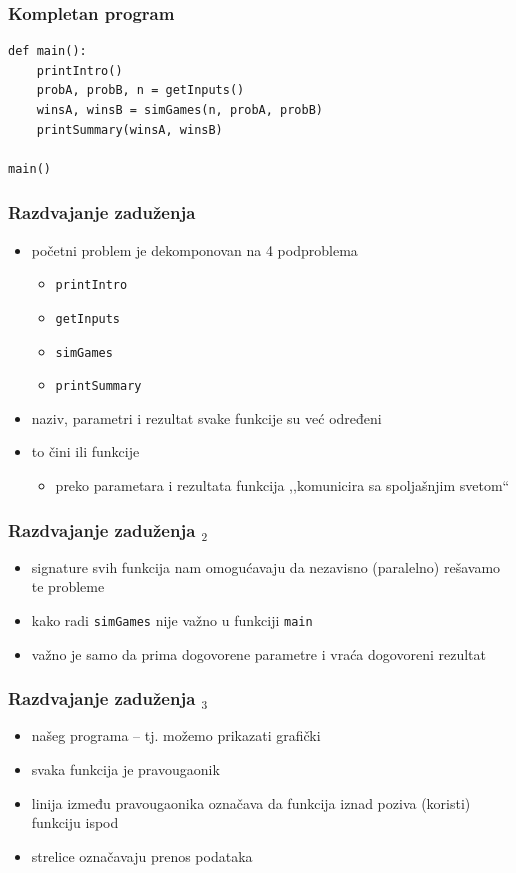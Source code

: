 \documentclass[utf8,compress]{beamer}
\begin{document}
\begin{frame}[fragile]
  \frametitle{Kompletan program}
\begin{verbatim}
def main():
    printIntro()
    probA, probB, n = getInputs()
    winsA, winsB = simGames(n, probA, probB)
    printSummary(winsA, winsB)

main()
\end{verbatim}
\end{frame}

\begin{frame}
  \frametitle{Razdvajanje zaduženja}
  \begin{itemize}
    \item početni problem je dekomponovan na 4 podproblema
    \begin{itemize}
      \item \texttt{printIntro}
      \item \texttt{getInputs}
      \item \texttt{simGames}
      \item \texttt{printSummary}
    \end{itemize}
    \item naziv, parametri i rezultat svake funkcije su već određeni
    \item to čini  ili  funkcije
    \begin{itemize}
      \item preko parametara i rezultata funkcija ,,komunicira sa spoljašnjim svetom``
    \end{itemize}
  \end{itemize}
\end{frame}

\begin{frame}
  \frametitle{Razdvajanje zaduženja $_2$}
  \begin{itemize}
    \item signature svih funkcija nam omogućavaju da nezavisno (paralelno) rešavamo te probleme
    \item kako radi \texttt{simGames} nije važno u funkciji \texttt{main}
    \item važno je samo da prima dogovorene parametre i vraća dogovoreni rezultat
  \end{itemize}
\end{frame}

\begin{frame}
  \frametitle{Razdvajanje zaduženja $_3$}
  \begin{itemize}
    \item {} našeg programa -- tj.  možemo prikazati grafički
    \item svaka funkcija je pravougaonik
    \item linija između pravougaonika označava da funkcija iznad poziva (koristi) funkciju ispod
    \item strelice označavaju prenos podataka
  \end{itemize}
\end{frame}
\end{document}
